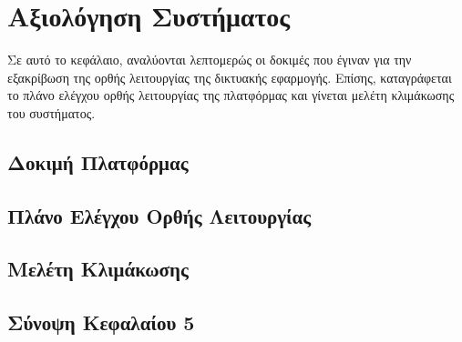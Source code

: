 \chapter{Αξιολόγηση Συστήματος}
Σε αυτό το κεφάλαιο, αναλύονται λεπτομερώς οι δοκιμές που έγιναν για την εξακρίβωση της ορθής λειτουργίας της δικτυακής εφαρμογής. Επίσης, καταγράφεται το πλάνο ελέγχου ορθής λειτουργίας της πλατφόρμας και γίνεται μελέτη κλιμάκωσης του συστήματος.

\section{Δοκιμή Πλατφόρμας}

\section{Πλάνο Ελέγχου Ορθής Λειτουργίας}

\section{Μελέτη Κλιμάκωσης}

\section{Σύνοψη Κεφαλαίου 5}
